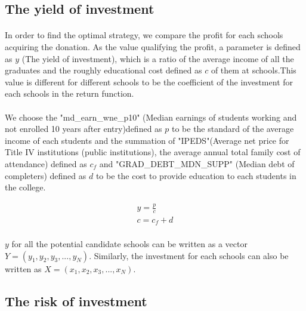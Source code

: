 \documentclass{mcmthesis}
\begin{document}
\subsection{The yield of investment}  
\paragraph{} In order to find the optimal strategy, we compare the profit for each schools acquiring the donation. As the value qualifying the profit, a parameter is defined as $y$ (The yield of investment), which is a ratio of the average income of all the graduates and the roughly educational cost defined as $c$ of them at schools.This value is different for different schools to be the coefficient of the investment for each schools in the return function.
\paragraph{} We choose the "md\_earn\_wne\_p10" (Median earnings of students working and not enrolled 10 years after entry)defined as $p$ to be the standard of the average income of each students and the summation of "IPEDS"(Average net price for Title IV institutions (public institutions), the average annual total family cost of attendance) defined as $c_f$ and "GRAD\_DEBT\_MDN\_SUPP" (Median debt of completers) defined as $d$ to be the cost to provide education to each students in the college.

\begin{align}
y=\frac{p}{c}\\
c=c_f+d
\end{align}

\paragraph{} $y$ for all the potential candidate schools can be written as a vector $Y=(y_1, y_2, y_3, ..., y_N)$. Similarly, the investment for each schools can also be written as $X=(x_1, x_2, x_3, ..., x_N)$.

\subsection{The risk of investment}
\end{document}
